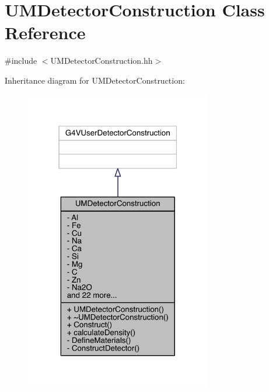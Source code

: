 \hypertarget{classUMDetectorConstruction}{}\section{U\+M\+Detector\+Construction Class Reference}
\label{classUMDetectorConstruction}


{\ttfamily \#include $<$U\+M\+Detector\+Construction.\+hh$>$}



Inheritance diagram for U\+M\+Detector\+Construction\+:
\nopagebreak
\begin{figure}[H]
\begin{center}
\leavevmode
\includegraphics[width=231pt]{classUMDetectorConstruction__inherit__graph}
\end{center}
\end{figure}


